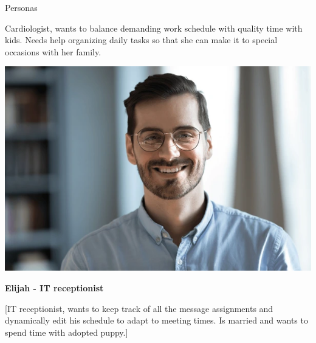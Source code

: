 \documentclass[final]{beamer}
\newlength{\colwidth}
\begin{document}
\begin{frame}[t]
\begin{columns}[t]
\begin{column}{\colwidth}
\begin{block}{Personas}
\begin{minipage}[t]{0.65\linewidth}
      Cardiologist, wants to balance demanding work schedule with quality time with kids. Needs help organizing daily tasks so that she can make it to special occasions with her family.
    \end{minipage}
    
    \vspace{0.5cm}
    
    \begin{minipage}[t]{0.3\linewidth}
      \centering
      \includegraphics[width=0.8\linewidth]{Elijah.png}
    \end{minipage}
    \hfill
    \begin{minipage}[t]{0.65\linewidth}
      \textbf{Elijah - IT receptionist}
      
      [IT receptionist, wants to keep track of all the message assignments and dynamically edit his schedule to adapt to meeting times. Is married and wants to spend time with adopted puppy.]
    \end{minipage}
    
    \vspace{0.5cm}
    

\end{block}
\end{column}
\end{columns}
\end{frame}
\end{document}
